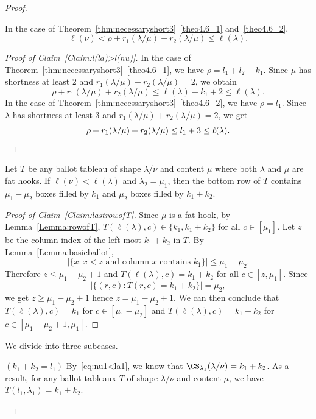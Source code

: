 \begin{proof}
\begin{Case}
\begin{claim}
\label{Claim:l(la)>l(nu)}
In the case of Theorem~\ref{thm:necessaryshort3}~\ref{theo4.6_1} and~\ref{theo4.6_2}, 
\[
\ell(\nu)<\rho+r_1(\lambda/\mu)+r_2(\lambda/\mu)\leq \ell(\lambda).
\]
\end{claim}

\begin{proof}[Proof of Claim~\ref{Claim:l(la)>l(nu)}] 
In the case of Theorem~\ref{thm:necessaryshort3}~\ref{theo4.6_1}, we have $\rho = l_1+l_2-k_1$. Since $\mu$ has shortness at least $2$ and $r_1(\lambda/\mu)+r_2(\lambda/\mu) = 2$, we obtain 
\[
\rho+r_1(\lambda/\mu)+r_2(\lambda/\mu)\leq \ell(\lambda)-k_1+2 \leq \ell(\lambda).
\] 
In the case of Theorem~\ref{thm:necessaryshort3}~\ref{theo4.6_2}, we have $\rho = l_1$. Since $\lambda$ has shortness at least $3$ and $r_1(\lambda/\mu)+r_2(\lambda/\mu) = 2$, we get
\[
\rho+r_1(\lambda/\mu)+r_2(\lambda/\mu)\leq l_1+3 \leq \ell(\lambda).\qedhere
\]
\end{proof}

\begin{claim}
\label{Claim:lastrowofT}
Let $T$ be any ballot tableau of shape $\lambda/\nu$ and content $\mu$ where both $\lambda$ and $\mu$ are fat hooks. If $\ell(\nu)<\ell(\lambda)$ and $\lambda_2 = \mu_1$, then the bottom row of $T$ contains $\mu_1-\mu_2$ boxes filled by $k_1$ and $\mu_2$ boxes filled by $k_1+k_2$.
\end{claim}
\begin{proof}[Proof of Claim~\ref{Claim:lastrowofT}] 
Since $\mu$ is a fat hook, by Lemma~\ref{Lemma:rowofT}, $T(\ell(\lambda),c) \in \{k_1,k_1+k_2\}$ for all $c\in [\mu_1]$. Let $z$ be the column index of the left-most $k_1+k_2$ in $T$. By Lemma~\ref{Lemma:basicballot}, 
\[
 |\{ x : x < z\text{ and column $x$ contains $k_1$} \}| \leq \mu_1-\mu_2 .
\]
Therefore $z\leq \mu_1-\mu_2+1$ and $T(\ell(\lambda),c) = k_1+k_2$ for all $c\in[z,\mu_1]$. Since 
\[
|\{(r,c):T(r,c) = k_1+k_2\}| = \mu_2,
\]
we get $z\geq \mu_1-\mu_2+1$ hence $z = \mu_1-\mu_2+1$.
We can then conclude that $T(\ell(\lambda),c) = k_1$ for $c\in[\mu_1-\mu_2]$ and $T(\ell(\lambda),c) = k_1+k_2$ for $c\in[\mu_1-\mu_2+1,\mu_1]$.
\end{proof}


We divide into three subcases.
\end{Case}

\begin{Case}
{ $(k_1+k_2 = l_1)$} 
By~\eqref{eq:nu1<la1}, we know that $\CS _{\lambda_1}(\lambda / \nu) = k_1+k_2$. As a result, for any ballot tableaux $T$ of shape $\lambda/\nu$ and content $\mu$, we have $T(l_1,\lambda_1) = k_1+k_2$. 


\end{Case}
\end{proof}
